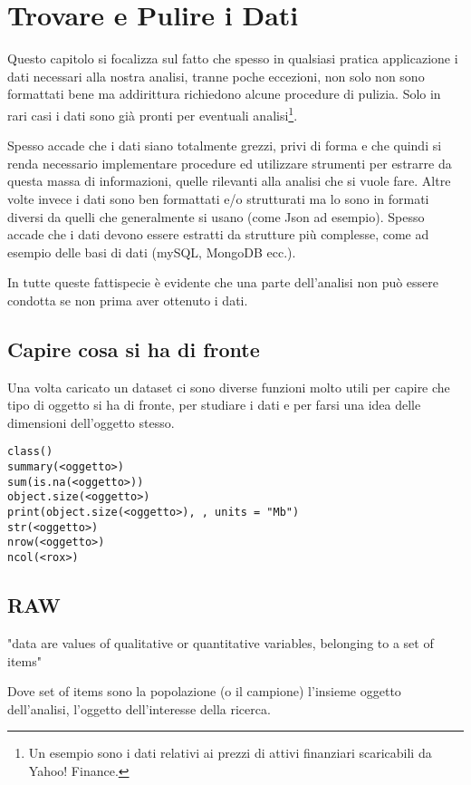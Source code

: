 \chapter{Trovare e Pulire i Dati}
Questo capitolo si focalizza sul fatto che spesso in qualsiasi pratica applicazione i dati necessari alla nostra analisi, tranne poche eccezioni, non solo non sono formattati bene ma addirittura richiedono alcune procedure di pulizia. Solo in rari casi i dati sono già pronti per eventuali analisi\footnote{Un esempio sono i dati relativi ai prezzi di attivi finanziari scaricabili da Yahoo! Finance.}.

Spesso accade che i dati siano totalmente grezzi, privi di forma e che quindi si renda necessario implementare procedure ed utilizzare strumenti per estrarre da questa massa  di informazioni, quelle rilevanti alla analisi che si vuole fare. Altre volte invece i dati sono ben formattati e/o strutturati ma lo sono in formati
diversi da quelli che generalmente si usano (come Json ad esempio). Spesso accade che i dati devono essere estratti da strutture più complesse, come ad esempio delle basi di dati (mySQL, MongoDB ecc.).

In tutte queste fattispecie è evidente che una parte dell'analisi non può essere condotta se non prima aver ottenuto i dati.


\section{Capire cosa si ha di fronte}
Una volta caricato un dataset ci sono diverse funzioni molto utili per capire che tipo di oggetto si ha di fronte, per studiare i dati e per farsi una idea delle dimensioni dell'oggetto stesso.
\begin{lstlisting}
class()
summary(<oggetto>)
sum(is.na(<oggetto>))
object.size(<oggetto>)
print(object.size(<oggetto>), , units = "Mb")
str(<oggetto>)
nrow(<oggetto>)
ncol(<rox>)
\end{lstlisting}

\section{RAW}

"data are values of qualitative or quantitative variables, belonging to a set of items"

Dove set of items sono la popolazione (o il campione) l'insieme oggetto dell'analisi, l'oggetto dell'interesse della ricerca.


